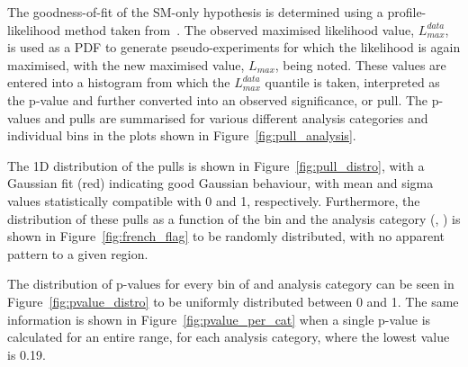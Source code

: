 
The goodness-of-fit of the SM-only hypothesis is determined using a profile-likelihood method
taken from~\cite{Cowan:358560}.
The observed maximised likelihood value, $L^{data}_{max}$, is used as a
PDF to generate
pseudo-experiments for which the likelihood is again maximised, with the 
new maximised value, $L_{max}$, being noted. These
values are entered into a histogram from which the $L^{data}_{max}$ quantile is taken, 
interpreted as the p-value and further converted into an observed significance,
or pull.
The p-values and pulls are summarised for various different analysis categories and individual
\HT bins in the plots shown in Figure~\ref{fig:pull_analysis}.

The 1D distribution of the
pulls is shown in Figure~\ref{fig:pull_distro}, with a Gaussian fit (red)
indicating good Gaussian behaviour, with mean and sigma values statistically
compatible with 0 and 1, respectively. Furthermore, the distribution of
these pulls as a function of the \HT bin and
the analysis category (\nb, \nj) is shown in Figure~\ref{fig:french_flag} to be
randomly distributed, with no apparent pattern to a given region.

The distribution of p-values for every bin of \HT and analysis category can be
seen in Figure~\ref{fig:pvalue_distro} to be uniformly distributed between 0
and 1. The same information is shown in Figure~\ref{fig:pvalue_per_cat} when a
single p-value is calculated for an entire \HT range, for each analysis
category, where the lowest value is 0.19.





